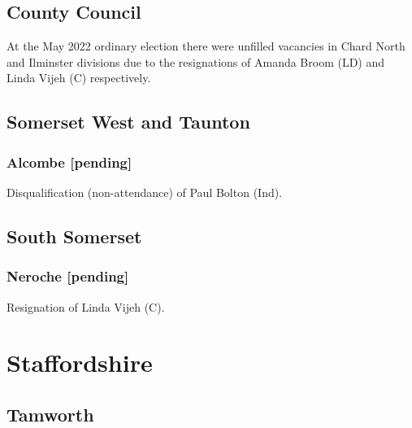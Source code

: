\documentclass[a4paper,openany]{book}
\begin{document}
\begin{resultsiii}
\subsection*{County Council}

At the May 2022 ordinary election there were unfilled vacancies in Chard North and Ilminster divisions due to the resignations of Amanda Broom (LD) and Linda Vijeh (C) respectively.%
%

\subsection*{Somerset West and Taunton}

\subsubsection*{Alcombe \hspace*{\fill}\nolinebreak[1]%
	\enspace\hspace*{\fill}
	[pending]}


Disqualification (non-attendance) of Paul Bolton (Ind).

\subsection*{South Somerset}

\subsubsection*{Neroche \hspace*{\fill}\nolinebreak[1]%
	\enspace\hspace*{\fill}
	[pending]}


Resignation of Linda Vijeh (C).

\section{Staffordshire}

\subsection*{Tamworth}


\end{resultsiii}
\end{document}
